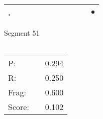 \documentclass[landscape]{article}
\newcommand{\ssp}{\hspace{2pt}}
\newcommand{\mex}{\cellcolor{g}$\bullet$}
\begin{document}
\begin{tabular}{|l|p{10pt}|p{10pt}|p{10pt}|p{10pt}|p{10pt}|p{10pt}|p{10pt}|p{10pt}|p{10pt}|p{10pt}|}
\hline
\ssp \cellcolor{ref9}. \ssp&\hspace{2pt}&\hspace{2pt}&\hspace{2pt}&\hspace{2pt}&\hspace{2pt}&\hspace{2pt}&\hspace{2pt}&\hspace{2pt}&\hspace{2pt}&\hspace{2pt}\mex\\
\hline
\end{tabular}

\vspace{6pt}
\noindent Segment 51\\\\
\noindent\begin{tabular}{lm{12pt}r}
\hline
P:&&0.294\\
R:&&0.250\\
Frag:&&0.600\\
Score:&&0.102\\
\end{tabular}

\newpage
\end{document}
